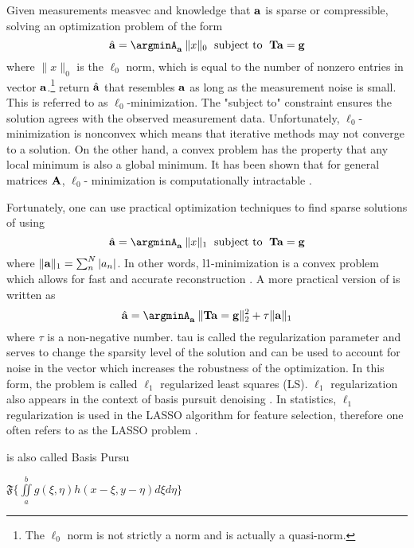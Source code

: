 Given measurements \gls{measvec} and knowledge that $\mathbf{a}$ is sparse or compressible, solving an optimization problem of the form 
\begin{equation}
	\mbh{a} = \argminA_{\mb{a}} \: \| x \|_{0} \text{\; subject to \;} \mb{Ta} = \mb{g}
	\label{eq:l0min}
\end{equation}
where $\| x \|_{0}$ is the $\ell_0$ norm, which is equal to the number of nonzero entries in vector $\mathbf{a}$.\footnote{The $\ell_0$ norm is not strictly a norm and is actually a quasi-norm.}  return $\hat{ \mathbf{a} }$ that resembles $\mathbf{a}$ as long as the measurement noise is small. This is referred to as $\ell_0$-minimization. The "subject to" constraint ensures the solution agrees with the observed measurement data. Unfortunately, $\ell_0$-minimization is nonconvex which means that iterative methods may not converge to a solution. On the other hand, a convex problem has the property that any local minimum is also a global minimum. It has been shown that for general matrices $\mathbf{A}$, $\ell_0$- minimization is computationally intractable \cite{aggarwal2007data}. 

Fortunately, one can use practical optimization techniques to find sparse solutions of \label{eq:gTa+e} using
\begin{equation}
	\mbh{a} = \argminA_{\mb{a}} \: \| x \|_{1} \text{\; subject to \;} \mb{Ta} = \mb{g}
	\label{eq:l1min}
\end{equation}
where $\| \mathbf{a} \|_1 = \sum_{n}^{N}|a_n|$. In other words, \gls{l1}-minimization is a convex problem which allows for fast and accurate reconstruction \cite{foucart2013mathematical}. A more practical version of  is written as
\begin{equation}
	\mbh{a} = \argminA_{\mb{a}} \: \| \mb{Ta} = \mb{g} \|_{2}^{2} + \tau \| \mb{a} \|_1
	\label{eq:l1regls}
\end{equation}
where $\tau$ is a non-negative number. \gls{tau} is called the regularization parameter and serves to change the sparsity level of the solution and can be used to account for noise in the vector which increases the robustness of the optimization. In this form, the problem is called $\ell_1$ regularized least squares (LS). $\ell_1$ regularization also appears in the context of basis pursuit denoising \cite{chen2001atomic}. In statistics, $\ell_1$ regularization is used in the LASSO algorithm for feature selection, therefore one often refers to  as the LASSO problem \cite{tibshirani1996regression}. 

 
 is also called Basis Pursu


$  \mathfrak{F} \{ \iint\limits_{a}^{b}  g( \xi, \eta )  h( x - \xi, y - \eta )  d \xi d \eta \}  $

%  
%



